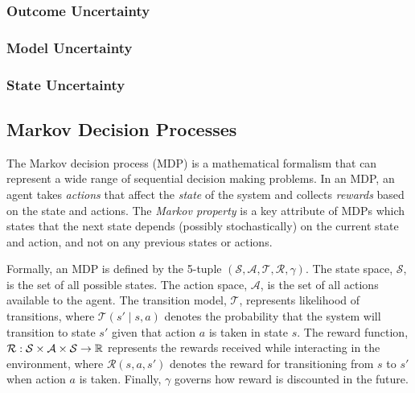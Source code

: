 \subsubsection{Outcome Uncertainty}
\subsubsection{Model Uncertainty}
\subsubsection{State Uncertainty}



\subsection{Markov Decision Processes}

The Markov decision process (MDP) is a mathematical formalism that can represent a wide range of sequential decision making problems. 
In an MDP, an agent takes \emph{actions} that affect the \emph{state} of the system and collects \emph{rewards} based on the state and actions.
The \emph{Markov property} is a key attribute of MDPs which states that the next state depends (possibly stochastically) on the current state and action, and not on any previous states or actions.

Formally, an MDP is defined by the 5-tuple $(\mathcal{S}, \mathcal{A}, \mathcal{T}, \mathcal{R}, \gamma)$.
The state space, $\mathcal{S}$, is the set of all possible states.
The action space, $\mathcal{A}$, is the set of all actions available to the agent.
The transition model, $\mathcal{T}$, represents likelihood of transitions, where $\mathcal{T}(s' \mid s, a)$ denotes the probability that the system will transition to state $s'$ given that action $a$ is taken in state $s$.
The reward function, $\mathcal{R}: \mathcal{S} \times \mathcal{A} \times \mathcal{S} \to \mathbb{R}$ represents the rewards received while interacting in the environment, where
$\mathcal{R}(s, a, s')$ denotes the reward for transitioning from $s$ to $s'$ when action $a$ is taken.
Finally, $\gamma$ governs how reward is discounted in the future.


